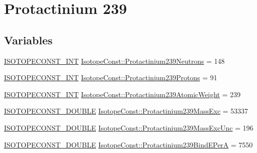 \hypertarget{group___isotope_const-_protactinium-_pa239}{}\section{Protactinium 239}
\label{group___isotope_const-_protactinium-_pa239}
\subsection*{Variables}
\begin{DoxyCompactItemize}
\item 
\mbox{\hyperlink{group___isotope_const-_macros_ga5f18360b3e99483a35c32d789e62621c}{I\+S\+O\+T\+O\+P\+E\+C\+O\+N\+S\+T\+\_\+\+I\+NT}} \mbox{\hyperlink{group___isotope_const-_protactinium-_pa239_ga51a1e50f415a6b26e1d7cf7092631bc5}{Isotope\+Const\+::\+Protactinium239\+Neutrons}} = 148
\item 
\mbox{\hyperlink{group___isotope_const-_macros_ga5f18360b3e99483a35c32d789e62621c}{I\+S\+O\+T\+O\+P\+E\+C\+O\+N\+S\+T\+\_\+\+I\+NT}} \mbox{\hyperlink{group___isotope_const-_protactinium-_pa239_ga9b6ab8b72e3356ba48321169fd9b76ed}{Isotope\+Const\+::\+Protactinium239\+Protons}} = 91
\item 
\mbox{\hyperlink{group___isotope_const-_macros_ga5f18360b3e99483a35c32d789e62621c}{I\+S\+O\+T\+O\+P\+E\+C\+O\+N\+S\+T\+\_\+\+I\+NT}} \mbox{\hyperlink{group___isotope_const-_protactinium-_pa239_ga4bd2d33b39a37b22555e02183882d265}{Isotope\+Const\+::\+Protactinium239\+Atomic\+Weight}} = 239
\item 
\mbox{\hyperlink{group___isotope_const-_macros_ga8f45a7272ce02c0b4c65c44636ed719a}{I\+S\+O\+T\+O\+P\+E\+C\+O\+N\+S\+T\+\_\+\+D\+O\+U\+B\+LE}} \mbox{\hyperlink{group___isotope_const-_protactinium-_pa239_gaaf474f5b8ffc01bcc452ff3cb73be571}{Isotope\+Const\+::\+Protactinium239\+Mass\+Exc}} = 53337
\item 
\mbox{\hyperlink{group___isotope_const-_macros_ga8f45a7272ce02c0b4c65c44636ed719a}{I\+S\+O\+T\+O\+P\+E\+C\+O\+N\+S\+T\+\_\+\+D\+O\+U\+B\+LE}} \mbox{\hyperlink{group___isotope_const-_protactinium-_pa239_ga14668995f0f733bf57be2bbb1528f598}{Isotope\+Const\+::\+Protactinium239\+Mass\+Exc\+Unc}} = 196
\item 
\mbox{\hyperlink{group___isotope_const-_macros_ga8f45a7272ce02c0b4c65c44636ed719a}{I\+S\+O\+T\+O\+P\+E\+C\+O\+N\+S\+T\+\_\+\+D\+O\+U\+B\+LE}} \mbox{\hyperlink{group___isotope_const-_protactinium-_pa239_ga742cb3593a3e2c54892e4febacf16bdd}{Isotope\+Const\+::\+Protactinium239\+Bind\+E\+PerA}} = 7550

\end{DoxyCompactItemize}
